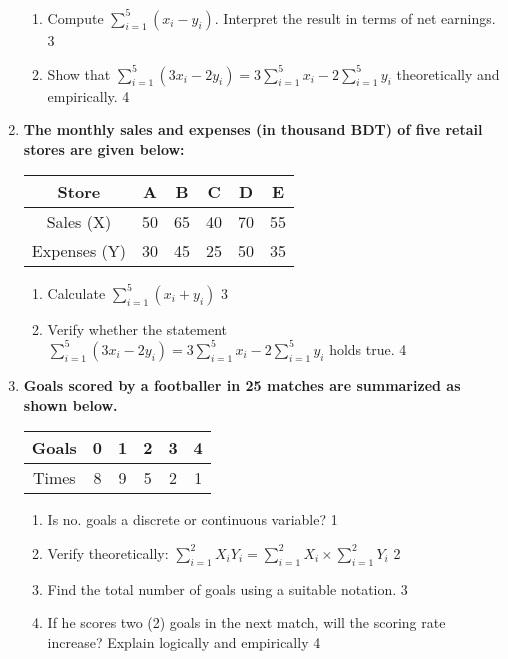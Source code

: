 \documentclass[a4paper,oneside]{book}
\begin{document}
\begin{enumerate}
  \begin{enumerate}
    \item  
	Compute $\displaystyle \sum_{i=1}^5 (x_i - y_i)$. Interpret the result in terms of net earnings. \hfill 3  
    \item  
	Show that $\displaystyle \sum_{i=1}^5 (3x_i - 2y_i) = 3 \sum_{i=1}^5 x_i - 2 \sum_{i=1}^5 y_i$ theoretically and empirically. \hfill 4  
  \end{enumerate}  

  
  \item
\textbf{The monthly sales and expenses (in thousand BDT) of five retail stores are given below:}

\begin{table}[h]
\centering
\begin{tabular}{c|ccccc}
Store & A & B & C & D & E \\ \hline
Sales (X) & 50 & 65 & 40 & 70 & 55 \\ \hline
Expenses (Y) & 30 & 45 & 25 & 50 & 35
\end{tabular}
\end{table}

\begin{enumerate}
    \item 
    Calculate $\displaystyle \sum_{i=1}^5 (x_i + y_i)$ \hfill 3
    \item 
    Verify whether the statement $\displaystyle \sum_{i=1}^5 (3x_i - 2y_i) = 3 \sum_{i=1}^5 x_i - 2 \sum_{i=1}^5 y_i$ holds true. \hfill 4
\end{enumerate}


\item
	  \textbf{Goals scored by a footballer in 25 matches are summarized as shown below.} 
	  
	  \begin{table}[h]
	  \centering
\begin{tabular}{|c|ccccc|}
Goals & 0 & 1 & 2 & 3 & 4 \\ \hline
Times & 8 & 9 & 5 & 2 & 1
\end{tabular}
\end{table}
  
  \begin{enumerate}
    \item
	Is no. goals a discrete or continuous variable? \hfill 1
    \item
	Verify theoretically: $\displaystyle \sum_{i=1}^{2} X_iY_i = \sum_{i=1}^{2} X_i \times \sum_{i=1}^{2} Y_i$ \hfill 2
    \item  
	Find the total number of goals using a suitable notation. \hfill 3
    \item
	If he scores two (2) goals in the next match, will the scoring rate increase? Explain logically and empirically \hfill 4
  \end{enumerate}
  

\end{enumerate}
\end{document}
